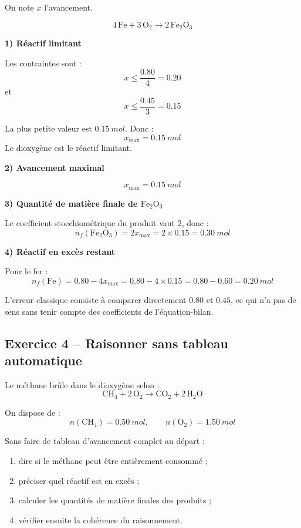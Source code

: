 \documentclass[11pt,a4paper]{article}
\newcommand{\Rlim}{réactif limitant}
\begin{document}
\begin{corrigebox}
On note \(x\) l'avancement.

\[
4\,\mathrm{Fe} + 3\,\mathrm{O_2} \rightarrow 2\,\mathrm{Fe_2O_3}
\]

\textbf{1) Réactif limitant}

Les contraintes sont :
\[
x \leq \frac{0.80}{4} = 0.20
\]
et
\[
x \leq \frac{0.45}{3} = 0.15
\]

La plus petite valeur est \(\SI{0.15}{mol}\).  
Donc :
\[
x_{\max} = \SI{0.15}{mol}
\]
Le dioxygène est le \Rlim.

\textbf{2) Avancement maximal}

\[
x_{\max} = \SI{0.15}{mol}
\]

\textbf{3) Quantité de matière finale de \(\mathrm{Fe_2O_3}\)}

Le coefficient stoechiométrique du produit vaut 2, donc :
\[
n_f(\mathrm{Fe_2O_3}) = 2x_{\max} = 2\times 0.15 = \SI{0.30}{mol}
\]

\textbf{4) Réactif en excès restant}

Pour le fer :
\[
n_f(\mathrm{Fe}) = 0.80 - 4x_{\max} = 0.80 - 4\times 0.15 = 0.80 - 0.60 = \SI{0.20}{mol}
\]

\begin{attentionbox}
L'erreur classique consiste à comparer directement \(0.80\) et \(0.45\), ce qui n'a pas de sens sans tenir compte des coefficients de l'équation-bilan.
\end{attentionbox}
\end{corrigebox}

\subsection{Exercice 4 -- Raisonner sans tableau automatique}

\begin{enoncebox}
Le méthane brûle dans le dioxygène selon :
\[
\mathrm{CH_4} + 2\,\mathrm{O_2} \rightarrow \mathrm{CO_2} + 2\,\mathrm{H_2O}
\]

On dispose de :
\[
n(\mathrm{CH_4}) = \SI{0.50}{mol}, \qquad n(\mathrm{O_2}) = \SI{1.50}{mol}
\]

Sans faire de tableau d'avancement complet au départ :
\begin{enumerate}[label=\arabic*)]
    \item dire si le méthane peut être entièrement consommé ;
    \item préciser quel réactif est en excès ;
    \item calculer les quantités de matière finales des produits ;
    \item vérifier ensuite la cohérence du raisonnement.
\end{enumerate}
\end{enoncebox}
\end{document}
